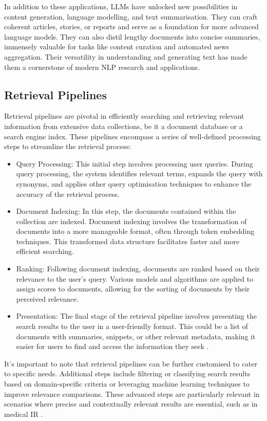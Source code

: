 In addition to these applications, LLMs have unlocked new possibilities in content generation, language modelling, and text summarisation. They can craft coherent articles, stories, or reports and serve as a foundation for more advanced language models. They can also distil lengthy documents into concise summaries, immensely valuable for tasks like content curation and automated news aggregation. Their versatility in understanding and generating text has made them a cornerstone of modern NLP research and applications.

\subsection{Retrieval Pipelines}
Retrieval pipelines are pivotal in efficiently searching and retrieving relevant information from extensive data collections, be it a document database or a search engine index. These pipelines encompass a series of well-defined processing steps to streamline the retrieval process:

\begin{itemize}
    \item Query Processing: This initial step involves processing user queries. During query processing, the system identifies relevant terms, expands the query with synonyms, and applies other query optimisation techniques to enhance the accuracy of the retrieval process.
    \item Document Indexing: In this step, the documents contained within the collection are indexed. Document indexing involves the transformation of documents into a more manageable format, often through token embedding techniques. This transformed data structure facilitates faster and more efficient searching.
    \item Ranking: Following document indexing, documents are ranked based on their relevance to the user's query. Various models and algorithms are applied to assign scores to documents, allowing for the sorting of documents by their perceived relevance.
    \item Presentation: The final stage of the retrieval pipeline involves presenting the search results to the user in a user-friendly format. This could be a list of documents with summaries, snippets, or other relevant metadata, making it easier for users to find and access the information they seek \cite{chen, zendel}.
\end{itemize}

It's important to note that retrieval pipelines can be further customised to cater to specific needs. Additional steps include filtering or classifying search results based on domain-specific criteria or leveraging machine learning techniques to improve relevance comparisons. These advanced steps are particularly relevant in scenarios where precise and contextually relevant results are essential, such as in medical IR \cite{lu}.

